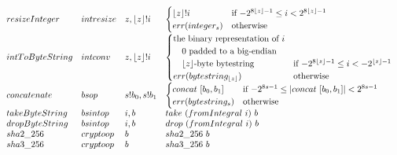 \documentclass[../main.tex]{subfiles}
\begin{document}
\begin{figure*}[t]
\[\begin{array}{lllll}
        resizeInteger   &  intresize  &   z, \lfloor z \rfloor!i   & \begin{cases}
            \lfloor z \rfloor!i & \text{if $-2^{8\lfloor z \rfloor-1} \leq i < 2^{8\lfloor z \rfloor-1}$}\\
            err(integer_s) & \text{otherwise}\\
        \end{cases}\\
        
        intToByteString  &   intconv  &  z, \lfloor z \rfloor!i           & \begin{cases}
            \text{the binary representation of $i$} \\
            \quad\text{$0$ padded to a big-endian}\\
            \quad\text{$\lfloor z \rfloor$-byte bytestring}&\text{if $-2^{8\lfloor z \rfloor-1} \leq i < -2^{\lfloor z \rfloor-1}$}\\
            err(bytestring_{\lfloor z \rfloor}) & \text{otherwise}\\
        \end{cases}\\
        
        
        concatenate   &   bsop   &   s!b_0 , s!b_1   & \begin{cases}
            concat \  [b_0,b_1] & \text{if $-2^{8s-1} \leq |concat \  [b_0,b_1]| < 2^{8s-1}$}\\
            err(bytestring_s) & \text{otherwise}\\
        \end{cases}\\
        
        takeByteString    &   bsintop   &   i, b     & take \  (fromIntegral \  i) \  b\\
        dropByteString    &   bsintop   &   i, b     & drop \  (fromIntegral \  i) \  b\\
        
        sha2\_256         &  cryptoop  &   b           & sha2\_256 \  b\\
        sha3\_256         &  cryptoop  &   b           & sha3\_256\  b\\
        

\end{array}\]
\end{figure*}
\end{document}

